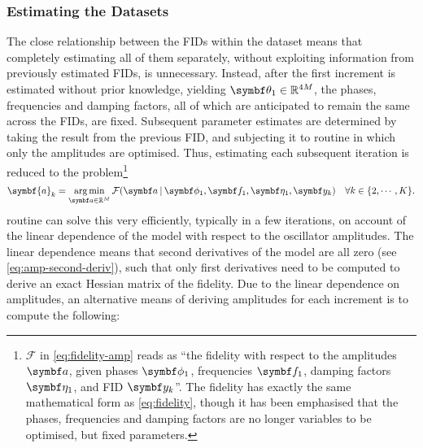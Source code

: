 \subsubsection{Estimating the Datasets}
The close relationship between the \acp{FID} within the dataset means that
completely estimating all of them separately, without exploiting information
from previously estimated \acp{FID}, is unnecessary.
Instead, after the first increment is estimated without prior knowledge,
yielding $\bth_{1} \in \mathbb{R}^{4M}$, the phases, frequencies and damping
factors, all of which are anticipated to remain the same across the
\acp{FID}, are fixed.
Subsequent parameter estimates are determined by taking the result from
the previous \ac{FID}, and subjecting it to  routine in which only
the amplitudes are optimised. Thus, estimating each subsequent iteration
is reduced to the problem\footnote{
    $\mathcal{F}$ in \cref{eq:fidelity-amp} reads as ``the fidelity
    with respect to the amplitudes $\bda$, given phases $\bdphi_{1}$,
    frequencies $\bdf_{1}$, damping factors  $\bdeta_{1}$, and \ac{FID}
    $\by_k$''. The fidelity has exactly the same mathematical form as
    \cref{eq:fidelity}, though it has been emphasised that the phases,
    frequencies and damping factors are no longer variables to be optimised,
    but fixed parameters.
}
\begin{equation}
    \symbf{a}_k = \argmin_{\bda \in \mathbb{R}^M}
        \mathcal{F}(\bda \hspace*{2pt} | \hspace*{2pt}
        \bdphi_{1}, \bdf_{1}, \bdeta_{1}, \by_k)\quad\forall k \in \lbrace2, \cdots, K\rbrace.
        \label{eq:fidelity-amp}
\end{equation}
 routine can solve this very efficiently, typically in a few
iterations, on account of the linear dependence of the model with respect to
the oscillator amplitudes. The linear dependence means that second
derivatives of the model are all zero (see \cref{eq:amp-second-deriv}),
such that only first derivatives need to be computed to derive an exact Hessian
matrix of the fidelity.
Due to the linear dependence on amplitudes, an alternative means of
deriving amplitudes for each increment is to compute the following:
